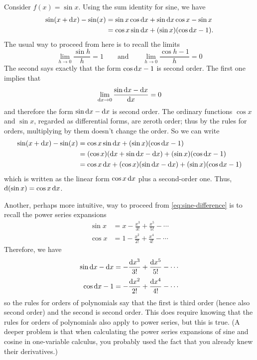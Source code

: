 \documentclass[12pt]{amsart}
\begin{document}
\begin{eg}
  Consider $f(x) = \sin x$.
  Using the sum identity for sine, we have
  \begin{align}
    \sin(x+\mathrm{d} x) - \sin (x)
    &= \sin x \cos \mathrm{d} x + \sin \mathrm{d} x \cos x - \sin x \notag\\
    &= \cos x \sin \mathrm{d} x + (\sin x) (\cos \mathrm{d} x - 1).\label{eq:sine-difference}
  \end{align}
  The usual way to proceed from here is to recall the limits
  \[ \lim_{h\to 0} \frac{\sin h}{h} = 1 \qquad\text{and}\qquad
  \lim_{h\to 0} \frac{\cos h - 1}{h} = 0 \]
  The second says exactly that the form $\cos \mathrm{d} x - 1$ is second order.
  The first one implies that
  \[ \lim_{\mathrm{d} x\to 0} \frac{\sin \mathrm{d} x - \mathrm{d} x}{\mathrm{d} x} = 0 \]
  and therefore the form $\sin \mathrm{d} x - \mathrm{d} x$ is second order.
  The ordinary functions $\cos x$ and $\sin x$, regarded as differential forms, are zeroth order; thus by the rules for orders, multiplying by them doesn't change the order.
  So we can write
  \begin{align*}
    \sin(x+\mathrm{d} x) - \sin (x)
    &= \cos x \sin \mathrm{d} x + (\sin x) (\cos \mathrm{d} x - 1)\\
    &= (\cos x )(\mathrm{d} x  + \sin \mathrm{d} x - \mathrm{d} x) + (\sin x) (\cos \mathrm{d} x - 1)\\
    &= \cos x \,\mathrm{d} x + (\cos x) (\sin \mathrm{d} x - \mathrm{d} x) + (\sin x) (\cos \mathrm{d} x - 1)
  \end{align*}
  which is written as the linear form $\cos x \,\mathrm{d} x$ plus a second-order one.
  Thus, $\mathrm{d}(\sin x) = \cos x \,\mathrm{d} x$.

  Another, perhaps more intuitive, way to proceed from \cref{eq:sine-difference} is to recall the power series expansions
  \begin{align*}
    \sin x &= x - \frac{x^3}{3!} + \frac{x^5}{5!} - \cdots\\[2pt]
    \cos x &= 1 - \frac{x^2}{2!} + \frac{x^4}{4!} - \cdots
  \end{align*}
  Therefore, we have
  \begin{align*}
    \sin \mathrm{d} x - \mathrm{d} x &= - \frac{\mathrm{d} x^3}{3!} + \frac{\mathrm{d} x^5}{5!} - \cdots\\[2pt]
    \cos \mathrm{d} x - 1 &= - \frac{\mathrm{d} x^2}{2!} + \frac{\mathrm{d} x^4}{4!} - \cdots
  \end{align*}
  so the rules for orders of polynomials say that the first is third order (hence also second order) and the second is second order.
  This does require knowing that the rules for orders of polynomials also apply to power series, but this is true.
  (A deeper problem is that when calculating the power series expansions of sine and cosine in one-variable calculus, you probably used the fact that you already knew their derivatives.)
\end{eg}
\end{document}
